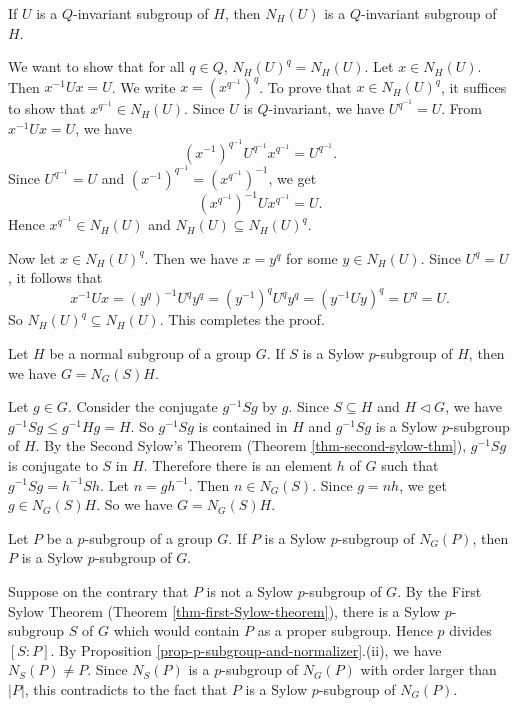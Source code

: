 \begin{lemma} \label{lemma-invariant-implies-invariant-normalizer}
	If $U$ is a $Q$-invariant subgroup of $H$, then $N_H(U)$ is a $Q$-invariant subgroup of $H$.
\end{lemma}
\begin{sketch}
	We want to show that for all $q\in Q$, $N_H(U)^q = N_H(U)$. Let $x\in N_H(U)$.  Then $x^{-1}Ux = U$. We write  $
		x = (x^{q^{-1}})^q$. To prove that $x\in N_H(U)^q$, it suffices to show that $x^{q^{-1}} \in N_H(U)$. Since $U$ is $Q$-invariant, we have $U^{q^{-1}} = U$. From $x^{-1}Ux = U$, we have $$(x^{-1})^{q^{-1}}U^{q^{-1}}x^{q^{-1}} = U^{q^{-1}}.$$
		Since $U^{q^{-1}} = U$ and $(x^{-1})^{q^{-1}} = (x^{q^{-1}})^{-1}$, we get 
		\begin{equation*}
			(x^{q^{-1}})^{-1}Ux^{q^{-1}} = U.
		\end{equation*}
		Hence $x^{q^{-1}}\in N_H(U)$ and $N_H(U)\subseteq N_H(U)^q$. 
		
		Now let $x\in N_H(U)^q$. Then we have $x = y^q$ for some $y\in N_H(U)$. Since $U^q = U$, it follows that
		\begin{equation*}
			x^{-1}U x= (y^q)^{-1} U^qy^q= (y^{-1})^qU^qy^q = (y^{-1}Uy)^q = U^q = U.
		\end{equation*}
		So $N_H(U)^q\subseteq N_H(U)$. This completes the proof.
\end{sketch}
\begin{lemma} \label{lemma-G=N_G(S)H}
	Let $H$ be a normal subgroup of a group $G$. If $S$ is a Sylow $p$-subgroup of $H$, then we have $G = N_G(S)H$.
\end{lemma}
\begin{sketch}
	Let $g\in G$. Consider the conjugate $g^{-1}Sg$ by $g$. Since $S \subseteq H$ and $H\lhd G$, we have $g^{-1}Sg \leq g^{-1}Hg = H$. So $g^{-1}Sg$ is contained in $H$ and $g^{-1}Sg$ is a Sylow $p$-subgroup of $H$. By the Second Sylow's Theorem (Theorem \ref{thm-second-sylow-thm}), $g^{-1}Sg$ is conjugate to $S$ in $H$. Therefore there is an element $h$ of $G$ such that $g^{-1}Sg = h^{-1}Sh$. Let $n = gh^{-1}$. Then  $n \in N_G(S)$. Since $g = nh$, we get $g \in N_G(S)H$. So we have $G = N_G(S)H$.
\end{sketch} 
\begin{lemma} \label{lemma-Sylow-in-normalizer-implies-Sylow-in-G}
	Let $P$ be a $p$-subgroup of a group $G$. If $P$ is a Sylow $p$-subgroup of $N_G(P)$, then $P$ is a Sylow $p$-subgroup of $G$.
\end{lemma}
\begin{sketch}
	Suppose on the contrary that $P$ is not a Sylow $p$-subgroup of $G$. By the First Sylow Theorem (Theorem \ref{thm-first-Sylow-theorem}), there is a Sylow $p$-subgroup $S$ of $G$ which would contain $P$ as a proper subgroup. Hence $p$ divides $[S:P]$. By Proposition \ref{prop-p-subgroup-and-normalizer}.(ii), we have $N_S(P) \neq P$. Since $N_S(P)$ is a $p$-subgroup of $N_G(P)$ with order larger than $|P|$, this contradicts to the fact that $P$ is a Sylow $p$-subgroup of $N_G(P)$.
\end{sketch}
